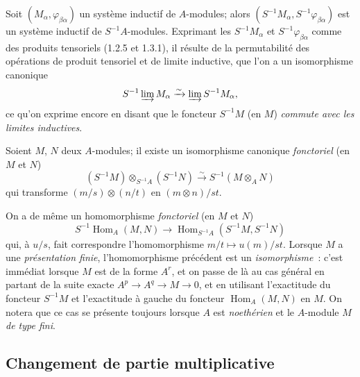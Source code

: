 \begin{env}[1.3.3]
\label{0.1.3.3-fr}
Soit $(M_\alpha,\varphi_{\beta\alpha})$ un système inductif de $A$-modules; alors $(S^{-1}M_\alpha,S^{-1}\varphi_{\beta\alpha})$ est un système inductif de $S^{-1}A$-modules.
Exprimant les $S^{-1}M_\alpha$ et $S^{-1}\varphi_{\beta\alpha}$ comme des produits tensoriels (1.2.5 et 1.3.1), il résulte de la permutabilité des opérations de produit tensoriel et de limite inductive, que l'on a un isomorphisme canonique
\[
  S^{-1}\varinjlim M_\alpha\xrightarrow{\sim}\varinjlim S^{-1}M_\alpha,
\]
ce qu'on exprime encore en disant que le foncteur $S^{-1}M$ (en $M$) \emph{commute avec les limites inductives}.
\end{env}

\begin{env}[1.3.4]
\label{0.1.3.4-fr}
Soient $M$, $N$ deux $A$-modules; il existe un isomorphisme canonique \emph{fonctoriel} (en $M$ et $N$)
\[
  (S^{-1}M)\otimes_{S^{-1}A}(S^{-1}N)
  \xrightarrow{\sim}
  S^{-1}(M\otimes_A N)
\]
qui transforme $(m/s)\otimes(n/t)$ en $(m\otimes n)/st$.
\end{env}

\begin{env}[1.3.5]
\label{0.1.3.5-fr}
On a de même un homomorphisme \emph{fonctoriel} (en $M$ et $N$)
\[
  S^{-1}\operatorname{Hom}_A(M,N)
  \longrightarrow
  \operatorname{Hom}_{S^{-1}A}(S^{-1}M,S^{-1}N)
\]
qui, à $u/s$, fait correspondre l'homomorphisme $m/t\mapsto u(m)/st$.
Lorsque $M$ a une \emph{présentation finie}, l'homomorphisme précédent est un \emph{isomorphisme}~: c'est immédiat lorsque $M$ est de la forme $A^r$, et on passe de là au cas général en partant de la suite exacte $A^p\to A^q\to M\to 0$, et en utilisant l'exactitude du foncteur $S^{-1}M$ et l'exactitude à gauche du foncteur $\operatorname{Hom}_A(M,N)$ en $M$.
On notera que ce cas se présente toujours lorsque $A$ est \emph{noethérien} et le $A$-module $M$ \emph{de type fini}.
\end{env}

\subsection{Changement de partie multiplicative}
\label{subsection:0.1.4-fr}

